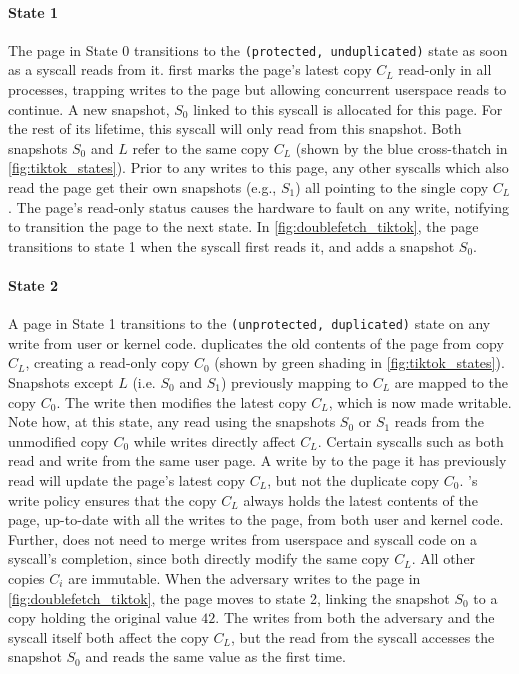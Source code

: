 \documentclass[letterpaper,twocolumn,10pt, anonymous]{article}
\begin{document}
\paragraph{State 1}
The page in State 0 transitions to the \texttt{(protected, unduplicated)} state as soon as a syscall 
reads from it.
\tiktok first marks the page's latest copy $C_L$ read-only in all processes, 
trapping writes to the page but allowing concurrent userspace reads to continue.
A new snapshot, $S_0$ linked to this syscall is allocated for this page.
For the rest of its lifetime, this syscall will only read from this snapshot.
Both snapshots $S_0$ and $L$ refer to the same copy $C_L$ (shown by the 
blue cross-thatch in \autoref{fig:tiktok_states}).
Prior to any writes to this page, any other syscalls which also read the page  
get their own snapshots (e.g., $S_1$) all pointing to the single copy $C_L$.
The page's read-only status causes the hardware to fault on any write,
notifying \tiktok to transition the page to the next state.
In \autoref{fig:doublefetch_tiktok}, the page transitions to state 1 when 
the syscall first reads it, and adds a snapshot $S_0$.

\paragraph{State 2}
A page in State 1 transitions to the \texttt{(unprotected, duplicated)} state 
on any write from user or kernel code.
\tiktok duplicates the old contents of the page from copy $C_L$, creating a 
read-only copy $C_0$ (shown by green shading in \autoref{fig:tiktok_states}).
Snapshots except $L$ (i.e. $S_0$ and $S_1$) previously mapping to $C_L$ are 
mapped to the copy $C_0$.
The write then modifies the latest copy $C_L$, which is now made writable.
Note how, at this state, any read using the snapshots $S_0$ or $S_1$ reads 
from the unmodified copy $C_0$ while writes directly affect $C_L$.
Certain syscalls such as  both read and write from 
the same user page. 
A write by  to the page it has previously read will update
the page's latest copy $C_L$, but not the duplicate copy $C_0$.
\tiktok's write policy ensures that the copy $C_L$ always holds the latest 
contents of the page, up-to-date with all the writes to the page, from both user 
and kernel code. 
Further, \tiktok does not need to merge writes from userspace and syscall code
on a syscall's completion, since both directly modify the same copy $C_L$.
All other copies $C_i$ are immutable.
When the adversary writes to the page in \autoref{fig:doublefetch_tiktok}, the
page moves to state 2, linking the snapshot $S_0$ to a copy holding the 
original value $42$.
The writes from both the adversary and the syscall itself both affect 
the copy $C_L$, but the read from the syscall accesses the snapshot $S_0$
and reads the same value as the first time.
\end{document}
